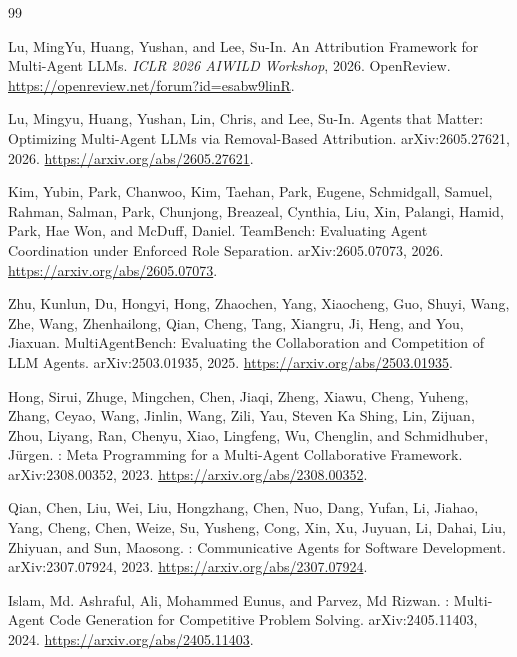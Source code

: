 \begin{thebibliography}{99}

Lu, MingYu, Huang, Yushan, and Lee, Su-In.
\newblock An Attribution Framework for Multi-Agent LLMs.
\newblock \emph{ICLR 2026 AIWILD Workshop}, 2026.
\newblock OpenReview. \url{https://openreview.net/forum?id=esabw9linR}.

Lu, Mingyu, Huang, Yushan, Lin, Chris, and Lee, Su-In.
\newblock Agents that Matter: Optimizing Multi-Agent LLMs via Removal-Based Attribution.
\newblock arXiv:2605.27621, 2026.
\newblock \url{https://arxiv.org/abs/2605.27621}.

Kim, Yubin, Park, Chanwoo, Kim, Taehan, Park, Eugene, Schmidgall, Samuel, Rahman, Salman, Park, Chunjong, Breazeal, Cynthia, Liu, Xin, Palangi, Hamid, Park, Hae Won, and McDuff, Daniel.
\newblock TeamBench: Evaluating Agent Coordination under Enforced Role Separation.
\newblock arXiv:2605.07073, 2026.
\newblock \url{https://arxiv.org/abs/2605.07073}.

Zhu, Kunlun, Du, Hongyi, Hong, Zhaochen, Yang, Xiaocheng, Guo, Shuyi, Wang, Zhe, Wang, Zhenhailong, Qian, Cheng, Tang, Xiangru, Ji, Heng, and You, Jiaxuan.
\newblock MultiAgentBench: Evaluating the Collaboration and Competition of LLM Agents.
\newblock arXiv:2503.01935, 2025.
\newblock \url{https://arxiv.org/abs/2503.01935}.

Hong, Sirui, Zhuge, Mingchen, Chen, Jiaqi, Zheng, Xiawu, Cheng, Yuheng, Zhang, Ceyao, Wang, Jinlin, Wang, Zili, Yau, Steven Ka Shing, Lin, Zijuan, Zhou, Liyang, Ran, Chenyu, Xiao, Lingfeng, Wu, Chenglin, and Schmidhuber, J{\"u}rgen.
: Meta Programming for a Multi-Agent Collaborative Framework.
\newblock arXiv:2308.00352, 2023.
\newblock \url{https://arxiv.org/abs/2308.00352}.

Qian, Chen, Liu, Wei, Liu, Hongzhang, Chen, Nuo, Dang, Yufan, Li, Jiahao, Yang, Cheng, Chen, Weize, Su, Yusheng, Cong, Xin, Xu, Juyuan, Li, Dahai, Liu, Zhiyuan, and Sun, Maosong.
: Communicative Agents for Software Development.
\newblock arXiv:2307.07924, 2023.
\newblock \url{https://arxiv.org/abs/2307.07924}.

Islam, Md. Ashraful, Ali, Mohammed Eunus, and Parvez, Md Rizwan.
: Multi-Agent Code Generation for Competitive Problem Solving.
\newblock arXiv:2405.11403, 2024.
\newblock \url{https://arxiv.org/abs/2405.11403}.


\end{thebibliography}
